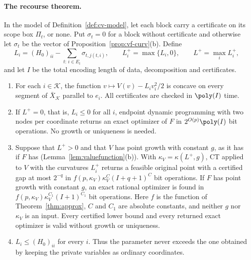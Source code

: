\paragraph{The recourse theorem.}

\begin{theorem}\label{thm:cv}
In the model of Definition~\ref{def:cv-model}, let each block carry a
certificate on its scope box $\Pi_t$, or none. Put $\sigma_t=0$ for a block
without certificate and otherwise let $\sigma_t$ be the vector of
Proposition~\ref{prop:vf-curv}(b). Define
\begin{equation}\label{eq:cv-L}
L_i=(H_0)_{ii}-\sum_{t:\,i\in E_t}\sigma_{t,j(t,i)},\qquad
L_i^+=\max\{L_i,0\},\qquad L^+=\max_iL_i^+,
\end{equation}
and let $I$ be the total encoding length of data, decomposition and
certificates.
\begin{enumerate}
\item[(i)] For each $i\in\mathcal K$, the function $v\mapsto V(v)-L_iv_i^2/2$
is concave on every segment of $\bar X_{\mathcal K}$ parallel to $e_i$. All
certificates are checked in $\poly(I)$ time.
\item[(ii)] If $L^+=0$, that is, $L_i\le0$ for all $i$, endpoint dynamic
programming with two nodes per coordinate returns an exact optimizer of $F$
in $2^{O(p)}\poly(I)$ bit operations. No growth or uniqueness is needed.
\item[(iii)] Suppose that $L^+>0$ and that $V$ has point growth with
constant $g$, as it has if $F$ has (Lemma~\ref{lem:valuefunction}(b)).
With $\kappa_V=\kappa(L^+,g)$, CT applied to $V$ with the curvatures $L_i^+$
returns a feasible original point with a certified gap at most $2^{-q}$ in
$f(p,\kappa_V)\kappa_V^C(I+q+1)^C$ bit operations. If $F$ has point growth
with constant $g$, an exact rational optimizer is found in
$f(p,\kappa_V)\kappa_V^{C_1}(I+1)^{C_1}$ bit operations. Here $f$ is the
function of Theorem~\ref{thm:approx}, $C$ and $C_1$ are absolute constants,
and neither $g$ nor $\kappa_V$ is an input. Every certified lower bound and
every returned exact optimizer is valid without growth or uniqueness.
\item[(iv)] $L_i\le(H_0)_{ii}$ for every $i$. Thus the parameter never
exceeds the one obtained by keeping the private variables as ordinary
coordinates.
\end{enumerate}
\end{theorem}

